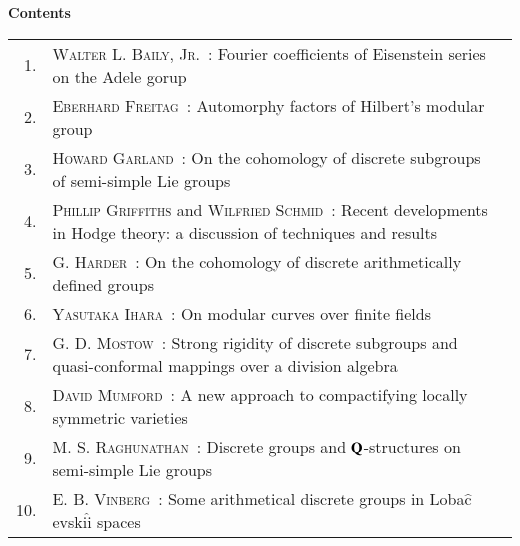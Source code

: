 
\thispagestyle{empty}

\noindent
{\bf\huge Contents}

\vskip 1cm


\noindent
\renewcommand{\arraystretch}{1.7}
\begin{longtable}[l]{r>{\raggedright}p{9cm}r}
1. & \textsc{Walter L. Baily, Jr.~:} Fourier coefficients of Eisenstein series on the Adele gorup & \\
2. & \textsc{Eberhard Freitag~:} Automorphy factors of Hilbert's modular group & \\
3. & \textsc{Howard Garland~:} On the cohomology of discrete subgroups of semi-simple Lie groups &\\
4. & \textsc{Phillip Griffiths} and \textsc{Wilfried Schmid~:} Recent developments in Hodge theory: a discussion of techniques and results & \\
5. & \textsc{G. Harder~:} On the cohomology of discrete arithmetically defined groups & \\
6. & \textsc{Yasutaka Ihara~:} On modular curves over finite fields & \\
7. & \textsc{G. D. Mostow~:} Strong rigidity of discrete subgroups and quasi-conformal mappings over a division algebra & \\
8. & \textsc{David Mumford~:} A new approach to compactifying locally symmetric varieties & \\
9. &  \textsc{M. S. Raghunathan~:} Discrete groups and $\mathbf{Q}$-structures on semi-simple Lie groups & \\
10. &  \textsc{E. B. Vinberg~:} Some arithmetical discrete groups in Loba$\hat{\text{c}}$evski$\hat{\text{i}}$ spaces &\\ 
\end{longtable}

\thispagestyle{empty}
